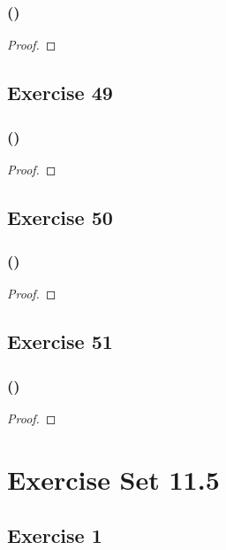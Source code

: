 \documentclass[14pt]{extarticle}
\begin{document}
\subsubsection{()}

\begin{proof}

\end{proof}

\subsection{Exercise 49}

\subsubsection{()}

\begin{proof}

\end{proof}

\subsection{Exercise 50}

\subsubsection{()}

\begin{proof}

\end{proof}

\subsection{Exercise 51}

\subsubsection{()}

\begin{proof}

\end{proof}

\section{Exercise Set 11.5}

\subsection{Exercise 1}
\end{document}
